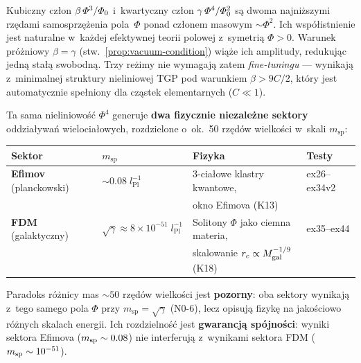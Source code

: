 \begin{remark}%
\label{rem:naturalnosc}
Kubiczny cz\l{}on $\beta\,\varPhi^3/\varPhi_0$ i~kwartyczny cz\l{}on
$\gamma\,\varPhi^4/\varPhi_0^2$ s\k{a} dwoma najni\.zszymi rz\k{e}dami
samosprz\k{e}\.zenia pola~$\Phi$ ponad cz\l{}onem masowym
$\sim\Phi^2$. Ich wsp\'o\l{}istnienie jest naturalne w~ka\.zdej
efektywnej teorii polowej z~symetri\k{a} $\Phi > 0$.
Warunek pr\'o\.zniowy $\beta = \gamma$ (stw.~\ref{prop:vacuum-condition})
wi\k{a}\.ze ich amplitudy, redukuj\k{a}c jedn\k{a} sta\l{}\k{a} swobodn\k{a}.
Trzy re\.zimy nie wymagaj\k{a} zatem \emph{fine-tuningu} --- wynikaj\k{a}
z~minimalnej struktury nieliniowej TGP pod warunkiem
$\beta > 9C/2$, kt\'ory jest automatycznie spe\l{}niony dla cz\k{a}stek
elementarnych ($C \ll 1$).
\end{remark}

\begin{remark}%
\label{rem:dwa-sektory-nbody}
Ta sama nieliniowo\'s\'c $\Phi^4$ generuje \textbf{dwa fizycznie
niezale\.zne sektory} oddzia\l{}ywa\'n wielocia\l{}owych, rozdzielone
o~ok.~50 rz\k{e}d\'ow wielko\'sci w~skali $m_{\mathrm{sp}}$:

\begin{center}\small
\begin{tabular}{@{}llll@{}}
\toprule
\textbf{Sektor} & $m_{\mathrm{sp}}$ & \textbf{Fizyka} & \textbf{Testy} \\
\midrule
\textbf{Efimov} (planckowski) &
  $\sim 0.08\;l_{\mathrm{Pl}}^{-1}$ &
  3-cia\l{}owe klastry kwantowe, & ex26--ex34v2 \\
  & & okno Efimova (K13) & \\[3pt]
\textbf{FDM} (galaktyczny) &
  $\sqrt{\gamma} \approx 8\times10^{-51}\;l_{\mathrm{Pl}}^{-1}$ &
  Solitony $\Phi$ jako ciemna materia, & ex35--ex44 \\
  & & skalowanie $r_c \propto M_{\rm gal}^{-1/9}$ (K18) & \\
\bottomrule
\end{tabular}
\end{center}

\noindent
Paradoks r\'o\.znicy mas $\sim 50$ rz\k{e}d\'ow wielko\'sci
jest \textbf{pozorny}: oba sektory wynikaj\k{a} z~tego samego
pola $\Phi$ przy $m_{\mathrm{sp}} = \sqrt{\gamma}$ (N0-6),
lecz opisuj\k{a} fizyk\k{e} na jako\'sciowo r\'o\.znych skalach energii.
Ich rozdzielno\'s\'c jest \textbf{gwarancj\k{a} sp\'ojno\'sci}:
wyniki sektora Efimova ($m_{\rm sp} \sim 0.08$) nie interferuj\k{a}
z~wynikami sektora FDM ($m_{\rm sp} \sim 10^{-51}$).
\end{remark}
